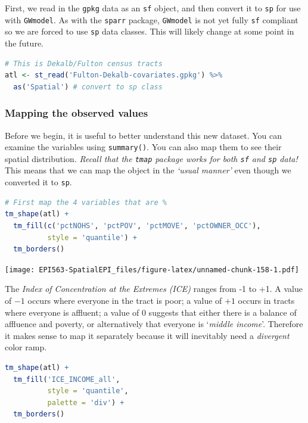 \documentclass[
]{book}
\newcommand{\passthrough}[1]{#1}
\begin{document}
First, we read in the \passthrough{\lstinline!gpkg!} data as an \passthrough{\lstinline!sf!} object, and then convert it to \passthrough{\lstinline!sp!} for use with \passthrough{\lstinline!GWmodel!}. As with the \passthrough{\lstinline!sparr!} package, \passthrough{\lstinline!GWmodel!} is not yet fully \passthrough{\lstinline!sf!} compliant so we are forced to use \passthrough{\lstinline!sp!} data classes. This will likely change at some point in the future.

\begin{lstlisting}[language=R]
# This is Dekalb/Fulton census tracts
atl <- st_read('Fulton-Dekalb-covariates.gpkg') %>%
  as('Spatial') # convert to sp class
\end{lstlisting}

\hypertarget{mapping-the-observed-values}{%
\subsubsection{Mapping the observed values}\label{mapping-the-observed-values}}

Before we begin, it is useful to better understand this new dataset. You can examine the variables using \passthrough{\lstinline!summary()!}. You can also map them to see their spatial distribution. \emph{Recall that the \passthrough{\lstinline!tmap!} package works for both \passthrough{\lstinline!sf!} and \passthrough{\lstinline!sp!} data!} This means that we can map the object in the \emph{`usual manner'} even though we converted it to \passthrough{\lstinline!sp!}.

\begin{lstlisting}[language=R]
# First map the 4 variables that are %
tm_shape(atl) + 
  tm_fill(c('pctNOHS', 'pctPOV', 'pctMOVE', 'pctOWNER_OCC'),
          style = 'quantile') +
  tm_borders()
\end{lstlisting}

\texttt{[image: EPI563-SpatialEPI\_files/figure-latex/unnamed-chunk-158-1.pdf]}

The \emph{Index of Concentration at the Extremes (ICE)} ranges from -1 to +1. A value of \(-1\) occurs where everyone in the tract is poor; a value of \(+1\) occurs in tracts where everyone is affluent; a value of \(0\) suggests that either there is a balance of affluence and poverty, or alternatively that everyone is `\emph{middle income}'. Therefore it makes sense to map it separately because it will inevitably need a \emph{divergent} color ramp.

\begin{lstlisting}[language=R]
tm_shape(atl) +
  tm_fill('ICE_INCOME_all',
          style = 'quantile',
          palette = 'div') +
  tm_borders()
\end{lstlisting}
\end{document}
